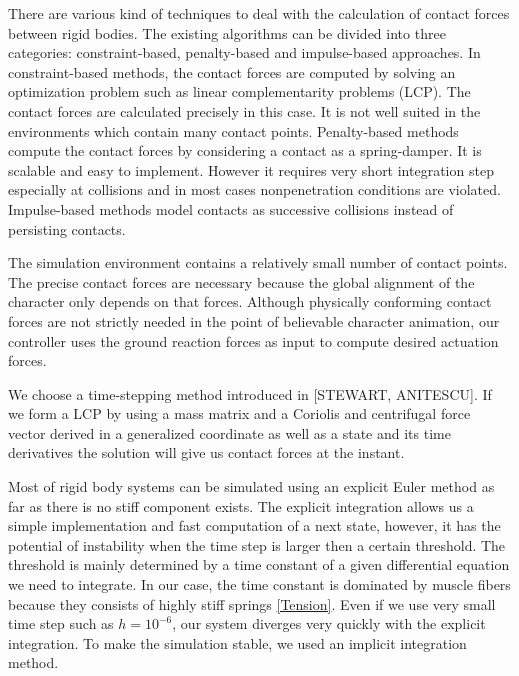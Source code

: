 \documentclass[a4paper,10pt]{article}
\begin{document}

There are various kind of techniques to deal with the calculation of
contact forces between rigid bodies. The existing algorithms can be
divided into three categories: constraint-based, penalty-based and
impulse-based approaches. In constraint-based methods, the contact
forces are computed by solving an optimization problem such as
linear complementarity problems (LCP). The contact forces are calculated
precisely in this case. It is not well suited in the environments
which contain many contact points. Penalty-based methods compute
the contact forces by considering a contact as a spring-damper.
It is scalable and easy to implement. However it requires very short
integration step especially at collisions and in most cases nonpenetration
conditions are violated. Impulse-based methods model contacts
as successive collisions instead of persisting contacts.

The simulation environment contains a relatively small number
of contact points. The precise contact forces are necessary because
the global alignment of the character only depends on that forces.
Although physically conforming contact forces are not strictly needed in
the point of believable character animation, our controller uses the
ground reaction forces as input to compute desired actuation forces.

We choose a time-stepping method introduced in [STEWART, ANITESCU].
If we form a LCP by using a mass matrix and a Coriolis and centrifugal force vector
derived in a generalized coordinate as well as a state and its time derivatives
the solution will give us contact forces at the instant.



Most of rigid body systems can be simulated using an explicit Euler method
as far as there is no stiff component exists. The explicit integration
allows us a simple implementation and fast computation of a next state,
however, it has the potential of instability when the time step is larger
then a certain threshold. The threshold is mainly determined by a time
constant of a given differential equation we need to integrate. In our case, the time
constant is dominated by muscle fibers because they consists
of highly stiff springs \eqref{Tension}. Even if we use very small time step
such as $h=10^{-6}$, our system diverges very quickly with the explicit
integration. To make the simulation stable, we used an implicit integration
method.
\end{document}

